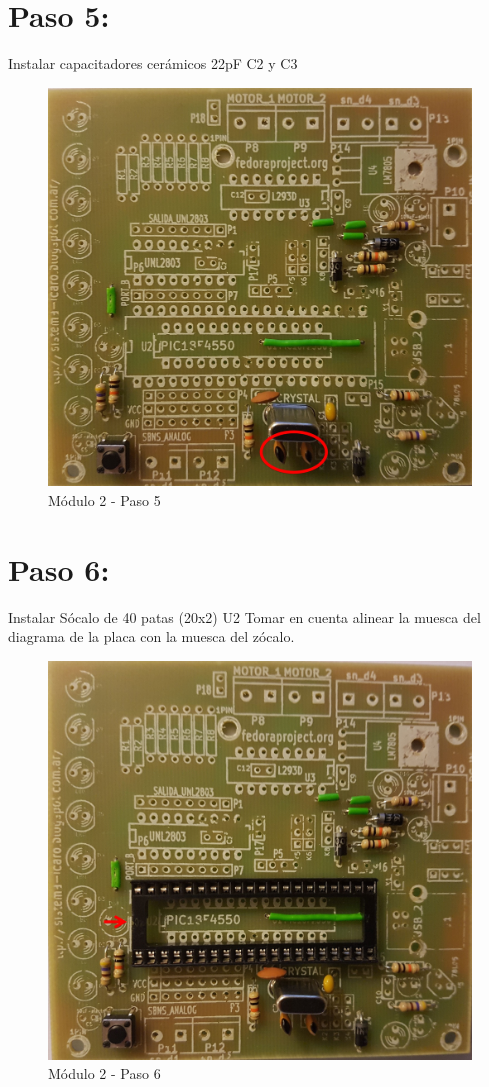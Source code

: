 \newpage

\section{Paso 5:}

Instalar capacitadores cerámicos 22pF C2 y C3

\begin{figure}[h]
	\centering
	\includegraphics[width=0.8\linewidth]{Modulo_2/M2_5}
	\caption{Módulo 2 - Paso 5}
	\label{fig:M2_5}
\end{figure}

\newpage

\section{Paso 6:}

Instalar Sócalo de 40 patas (20x2) U2 Tomar en cuenta alinear la muesca del diagrama de la placa con la muesca del zócalo.

\begin{figure}[h]
	\centering
	\includegraphics[width=0.8\linewidth]{Modulo_2/M2_6}
	\caption{Módulo 2 - Paso 6}
	\label{fig:M2_6}
\end{figure}

